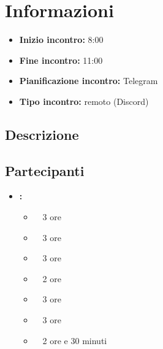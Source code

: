 \section{Informazioni}
\begin{itemize}
	\item \textbf{Inizio incontro:} 8:00
	\item \textbf{Fine incontro:} 11:00
	\item \textbf{Pianificazione incontro:} Telegram
	\item \textbf{Tipo incontro:} remoto (Discord)
\end{itemize}

\subsection{Descrizione}
\DocDescription

\subsection{Partecipanti}

\begin{itemize}
	\item \textbf{\GroupName:}
	\begin{itemize}
		\item \tommaso \ \rightarrow\ 3 ore
		\item \marco \ \rightarrow\ 3 ore
		\item \raul \ \rightarrow\ 3 ore
		\item \sebastiano \ \rightarrow\ 2 ore
		\item \martina \ \rightarrow\ 3 ore
		\item \riccardo \ \rightarrow\ 3 ore
		\item \mattia \ \rightarrow\ 2 ore e 30 minuti
	\end{itemize}
\end{itemize}

\clearpage
